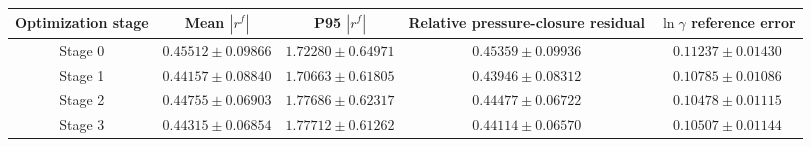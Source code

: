\begin{tabular}{ccccc}
\toprule
Optimization stage & Mean $|r^{f}|$ & P95 $|r^{f}|$ & Relative pressure-closure residual & $\ln\gamma$ reference error \\
\midrule
Stage 0 & $0.45512\pm0.09866$ & $1.72280\pm0.64971$ & $0.45359\pm0.09936$ & $0.11237\pm0.01430$ \\
Stage 1 & $\mathbf{0.44157\pm0.08840}$ & $\mathbf{1.70663\pm0.61805}$ & $\mathbf{0.43946\pm0.08312}$ & $0.10785\pm0.01086$ \\
Stage 2 & $0.44755\pm0.06903$ & $1.77686\pm0.62317$ & $0.44477\pm0.06722$ & $\mathbf{0.10478\pm0.01115}$ \\
Stage 3 & $0.44315\pm0.06854$ & $1.77712\pm0.61262$ & $0.44114\pm0.06570$ & $0.10507\pm0.01144$ \\
\bottomrule
\end{tabular}

